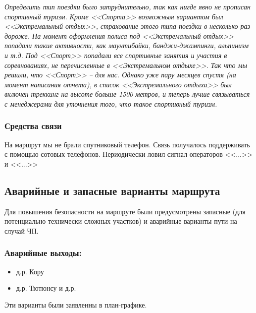			\textit{Определить тип поездки было затруднительно, так как нигде явно не прописан спортивный туризм.
			Кроме <<Спорта>> возможным вариантом был <<Экстремальный отдых>>, страхование этого типа поездки в
			несколько раз дороже. На момент оформления полиса под <<Экстремальный отдых>> попадали такие активности,
			как маунтибайки, банджи-джампинги, альпинизм и т.д. Под <<Спорт>> попадали все спортивные занятия и
			участия в соревнованиях, не перечисленные в <<Экстремальном отдыхе>>. Так что мы решили, что
			<<Спорт>> -- для нас. Однако уже пару месяцев спустя (на момент написания отчета), в список
			<<Экстремального отдыха>> был включен треккинг на высоте больше 1500 метров, и теперь лучше связываться
			с менеджерами для уточнения того, что такое спортивный туризм.}

		\subsubsection{Средства связи}
			На маршрут мы не брали спутниковый телефон. Связь получалось поддерживать с помощью сотовых телефонов.
			Периодически ловил сигнал операторов <<...>> и <<...>> 

	\subsection{Аварийные и запасные варианты маршрута}
		Для повышения безопасности на маршруте были предусмотрены запасные (для потенциально технически сложных участков) и 
		аварийные варианты пути  на случай ЧП.

		\subsubsection*{Аварийные выходы:}
			\begin{itemize}
				\item д.р. Кору
				\item д.р. Тютюнсу и д.р.
			\end{itemize}

			Эти варианты были заявленны в план-графике.

